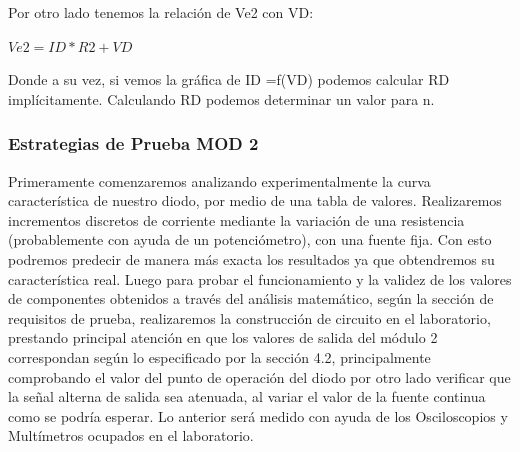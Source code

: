 Por otro lado tenemos la relación de Ve2 con VD:\Rpar 
\begin{center}
    $Ve2 = ID*R2 + VD$
\end{center}
Donde a su vez, si vemos la gráfica de ID =f(VD) podemos calcular RD implícitamente. Calculando RD podemos determinar un valor para n.\par







\subsubsection{Estrategias de Prueba MOD 2}
Primeramente comenzaremos analizando experimentalmente la curva característica de nuestro diodo, por medio de una tabla de valores. Realizaremos incrementos discretos de corriente mediante la variación de una resistencia (probablemente con ayuda de un potenciómetro), con una fuente fija. Con esto podremos predecir de manera más exacta los resultados ya que obtendremos su característica real.
Luego para probar el funcionamiento y la validez de los valores de componentes obtenidos a través del análisis matemático, según la sección de requisitos de prueba, realizaremos la construcción de circuito en el laboratorio, prestando principal atención en que los valores de salida del módulo 2 correspondan según lo especificado por la sección 4.2, principalmente comprobando el valor del punto de operación del diodo por otro lado verificar que la señal alterna de salida sea atenuada, al variar el valor de la fuente continua como se podría esperar.
Lo anterior será medido con ayuda de los Osciloscopios y Multímetros ocupados en el laboratorio.
